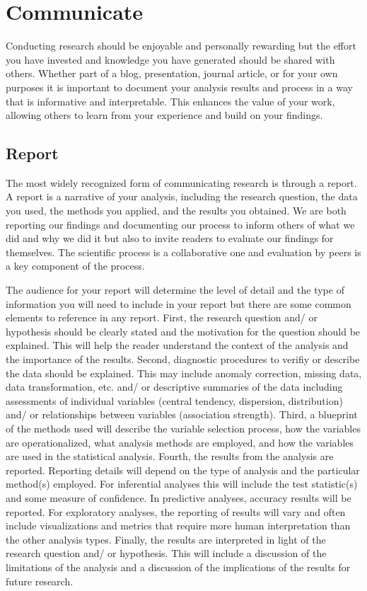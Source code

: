 \documentclass[
  letterpaper,
  DIV=11,
  numbers=noendperiod]{scrreport}
\theoremstyle{definition}
\theoremstyle{remark}
\begin{document}
\hypertarget{sec-aa-communicate}{%
\section{Communicate}\label{sec-aa-communicate}}

Conducting research should be enjoyable and personally rewarding but the
effort you have invested and knowledge you have generated should be
shared with others. Whether part of a blog, presentation, journal
article, or for your own purposes it is important to document your
analysis results and process in a way that is informative and
interpretable. This enhances the value of your work, allowing others to
learn from your experience and build on your findings.

\hypertarget{sec-aa-report}{%
\subsection{Report}\label{sec-aa-report}}

The most widely recognized form of communicating research is through a
report. A report is a narrative of your analysis, including the research
question, the data you used, the methods you applied, and the results
you obtained. We are both reporting our findings and documenting our
process to inform others of what we did and why we did it but also to
invite readers to evaluate our findings for themselves. The scientific
process is a collaborative one and evaluation by peers is a key
component of the process.

The audience for your report will determine the level of detail and the
type of information you will need to include in your report but there
are some common elements to reference in any report. First, the research
question and/ or hypothesis should be clearly stated and the motivation
for the question should be explained. This will help the reader
understand the context of the analysis and the importance of the
results. Second, diagnostic procedures to verifiy or describe the data
should be explained. This may include anomaly correction, missing data,
data transformation, etc. and/ or descriptive summaries of the data
including assessments of individual variables (central tendency,
dispersion, distribution) and/ or relationships between variables
(association strength). Third, a blueprint of the methods used will
describe the variable selection process, how the variables are
operationalized, what analysis methods are employed, and how the
variables are used in the statistical analysis. Fourth, the results from
the analysis are reported. Reporting details will depend on the type of
analysis and the particular method(s) employed. For inferential analyses
this will include the test statistic(s) and some measure of confidence.
In predictive analyses, accuracy results will be reported. For
exploratory analyses, the reporting of results will vary and often
include visualizations and metrics that require more human
interpretation than the other analysis types. Finally, the results are
interpreted in light of the research question and/ or hypothesis. This
will include a discussion of the limitations of the analysis and a
discussion of the implications of the results for future research.
\end{document}
